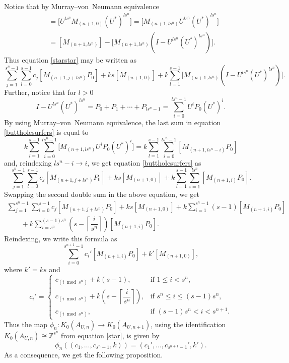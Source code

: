 \documentclass[pdftex]{sigma}
\newcommand{\Z}{{\mathbb Z}}
\numberwithin{equation}{section}
\begin{document}
Notice that by Murray--von~Neumann equivalence	
\begin{align*}
[M_{(n+1,0)}] &= \big[U^{ls^n} M_{(n+1,0)} (U^*)^{ls^n}\big] = \big[M_{(n+1,ls^n)} U^{ls^n}(U^*)^{ls^n}\big] \\
&= [M_{(n+1,ls^n)} ] - \big[M_{(n+1,ls^n)}(I-U^{ls^n}(U^*)^{ls^n})\big].
\end{align*}
Thus equation \eqref{starstar} may be written as
\begin{equation}\label{buttholesurfers}
\sum_{j=1}^{s^n-1} \sum_{l=0}^{s-1} c_j [M_{(n+1,j+ls^n)} P_0] + ks[M_{(n+1,0)}] + k \sum_{l=1}^{s-1} \big[M_{(n+1,ls^n)}(I-U^{ls^n}(U^*)^{ls^n})\big].
\end{equation}
Further, notice that for $l>0$
\begin{equation*}
I-U^{ls^n}(U^*)^{ls^n} = P_0 + P_1 + \cdots + P_{ls^n-1}= \sum_{i=0}^{ls^n-1} U^i P_0 (U^*)^i.
\end{equation*}
By using Murray--von~Neumann equivalence, the last sum in equation \eqref{buttholesurfers} is equal to
\begin{equation*}
k\sum_{l=1}^{s-1} \sum_{i=0}^{ls^n-1}\big[M_{(n+1,ls^n)}U^i P_0 (U^*)^i\big]
=k\sum_{l=1}^{s-1} \sum_{i=0}^{ls^n-1}[M_{(n+1,ls^n-i)}P_0]
\end{equation*}
and, reindexing $ls^n-i \to i$, we get equation \eqref{buttholesurfers} as
\begin{equation*}
\sum_{j=1}^{s^n-1} \sum_{l=0}^{s-1} c_j[M_{(n+1,j+ls^n)}P_0] + ks[M_{(n+1,0)}] + k\sum_{l=1}^{s-1} \sum_{i=1}^{ls^n} [M_{(n+1,i)}P_0].
\end{equation*}
Swapping the second double sum in the above equation, we get
\begin{gather*}
\sum_{j=1}^{s^n-1} \sum_{l=0}^{s-1} c_j[M_{(n+1,j+ls^n)}P_0] + ks[M_{(n+1,0)}] + k\sum_{i=1}^{s^n-1} (s-1)[M_{(n+1,i)}P_0]\\
\qquad{} +k\sum_{i=s^n}^{(s-1)s^n} \left(s-\left\lceil\dfrac{i}{s^n}\right\rceil\right) [M_{(n+1,i)}P_0].
\end{gather*}
Reindexing, we write this formula as
\begin{equation*}
\sum_{i=0}^{s^{n+1}-1} c_i'[M_{(n+1,i)}P_0] + k' [M_{(n+1,0)}],
\end{equation*}
where $k'=ks$ and
\begin{equation}\label{coeffs}
c_i' = \begin{cases}
c_{(i\bmod s^n)} + k(s-1), & \text{if } 1\le i < s^n, \\
c_{(i \bmod s^n)} + k\left(s-\left\lceil \dfrac{i}{s^n} \right\rceil\right), & \text{if }s^n \leq i \leq (s-1)s^n ,\\ c_{(i\bmod s^n)}, & \text{if } (s-1)s^n < i < s^{n+1}.
\end{cases}
\end{equation}
Thus the map $\phi_n \colon K_0(A_{U,n}) \to K_0(A_{U,n+1})$, using the identification $K_0(A_{U,n})\cong \Z^{s^n}$ from equation \eqref{star}, is given by
\begin{equation*}
\phi_n((c_1,\dots,c_{s^n-1},k)) = (c_1',\dots,c_{s^{n+1}-1}',k').
\end{equation*}
As a consequence, we get the following proposition.
\end{document}
